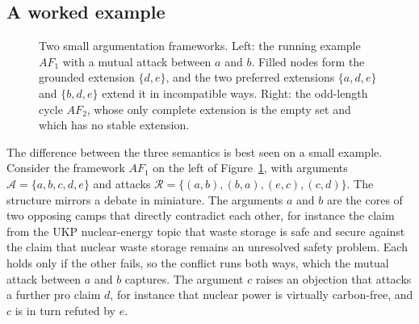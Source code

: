 \subsection*{A worked example}

\begin{figure}[tb]
  \centering
  \begin{minipage}[c]{0.58\linewidth}
    \centering
  \end{minipage}\hfill
  \begin{minipage}[c]{0.38\linewidth}
    \centering
  \end{minipage}
  \caption{Two small argumentation frameworks. Left: the running example
  $AF_1$ with a mutual attack between $a$ and $b$. Filled nodes form the
  grounded extension $\{d, e\}$, and the two preferred extensions
  $\{a, d, e\}$ and $\{b, d, e\}$ extend it in incompatible ways. Right: the
  odd-length cycle $AF_2$, whose only complete extension is the empty set and
  which has no stable extension.}
  \label{fig:foundations:example}
\end{figure}

The difference between the three semantics is best seen on a small example.
Consider the framework $AF_1$ on the left of
Figure~\ref{fig:foundations:example}, with arguments
$\mathcal{A} = \{a, b, c, d, e\}$ and attacks
$\mathcal{R} = \{(a,b), (b,a), (e,c), (c,d)\}$. The structure mirrors a debate
in miniature. The arguments $a$ and $b$ are the cores of two opposing camps
that directly contradict each other, for instance the claim from the UKP
nuclear-energy topic that waste storage is safe and secure against the claim
that nuclear waste storage remains an unresolved safety problem. Each holds
only if the other fails, so the conflict runs both ways, which the mutual
attack between $a$ and $b$ captures. The argument $c$ raises an objection that
attacks a further pro claim $d$, for instance that nuclear power is virtually
carbon-free, and $c$ is in turn refuted by $e$.

